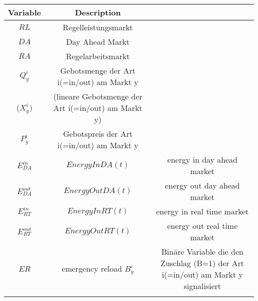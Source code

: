 \begin{tabular}{c|c|c}
	\textbf{Variable} & \textbf{Description}                                                                                             \\
	\hline
	$RL$              & Regelleistungsmarkt                                                                                              \\
	$DA$              & Day Ahead Markt                                                                                                  \\
	$RA$              & Regelarbeitsmarkt                                                                                                \\
	$Q^i_{y}$         & Gebotsmenge der Art i(=in/out) am Markt y                                                                        \\
	($X^i_{y})$       & (lineare Gebotsmenge der Art i(=in/out) am Markt y)                                                              \\
	$P^i_{y}$         & Gebotspreis der Art i(=in/out) am Markt y                                                                        \\
	$E^{in}_{DA}$     & $EnergyInDA(t)$                                                                   & energy in day ahead market   \\
	$E^{out}_{DA}$    & $EnergyOutDA(t)$                                                                  & energy out day ahead market  \\
	$E^{in}_{RT}$     & $EnergyInRT(t)$                                                                   & energy in real time market   \\
	$E^{out}_{RT}$    & $EnergyOutRT(t)$                                                                  & energy out  real time market \\
	$ER$              & emergency reload
	$B^i_y$           & Binäre Variable die den Zuschlag (B=1) der Art i(=in/out) am Markt y signalisiert                                \\
	\label{tab:my_label}                                                                                                                 \\
\end{tabular}
\\


